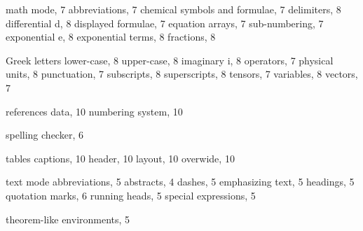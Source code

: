 \documentclass[graybox]{svmult}
\begin{document}
\begin{refguide}
\begin{theindex}
\indexspace

\item math mode, 7
\subitem abbreviations, 7
\subitem chemical symbols and formulae, 7
\subitem delimiters, 8
\subitem differential d, 8
\subitem displayed formulae, 7
\subitem equation arrays, 7
\subsubitem sub-numbering, 7
\subitem exponential e, 8
\subitem exponential terms, 8
\subitem fractions, 8

\vspace*{8pc}\columnbreak

\vspace*{-12.8pc}

\subitem Greek letters
\subsubitem lower-case, 8
\subsubitem upper-case, 8
\subitem imaginary i, 8
\subitem operators, 7
\subitem physical units, 8
\subitem punctuation, 7
\subitem subscripts, 8
\subitem superscripts, 8
\subitem tensors, 7
\subitem variables, 8
\subitem vectors, 7

\indexspace

\item references
\subitem data, 10
\subitem numbering system, 10

\indexspace

\item spelling checker, 6

\indexspace

\item tables
\subitem captions, 10
\subitem header, 10
\subitem layout, 10
\subitem overwide, 10

\item text mode
\subitem abbreviations, 5
\subitem abstracts, 4
\subitem dashes, 5
\subitem emphasizing text, 5
\subitem headings, 5
\subitem quotation marks, 6
\subitem running heads, 5
\subitem special expressions, 5
\item theorem-like environments, 5

\vfill\eject

\end{theindex}

\end{refguide}
\end{document}
